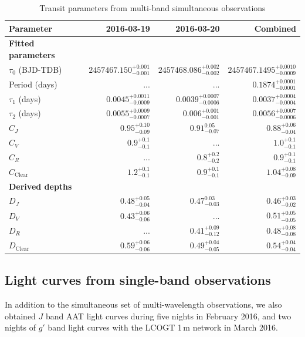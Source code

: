 \documentclass[iop,useAMES,usenatbig]{emulateapj}
\begin{document}
\begin{table}
\centering
\caption{\label{tab:simultaneous_params}Transit parameters from multi-band simultaneous observations}
\begin{tabular}{lrrr}
\hline\hline
Parameter & 2016-03-19 & 2016-03-20 & Combined\\
\hline
\textbf{Fitted parameters} & & & \\
$\tau_0$ (BJD-TDB) & $2457467.150_{-0.001}^{+0.001}$ & $2457468.086_{-0.002}^{+0.002}$ & $2457467.1495_{-0.0009}^{+0.0010}$\\
Period (days) & ... & ... & $0.1874_{-0.0001}^{+0.0001}$ \\ 
$\tau_1$ (days) & $0.0045_{-0.0009}^{+0.0011}$ & $0.0039_{-0.0006}^{+0.0007}$ & $0.0037_{-0.0004}^{+0.0004}$ \\
$\tau_2$ (days) & $0.0055_{-0.0007}^{+0.0009}$ & $0.006_{-0.001}^{+0.001}$ & $0.0056_{-0.0006}^{+0.0007}$ \\
$C_J$ & $0.95_{-0.09}^{+0.10}$ & $0.91_{-0.07}^{0.05}$ & $0.88_{-0.04}^{+0.06}$ \\
$C_V$ & $0.9_{-0.1}^{+0.1}$ & ... & $1.0_{-0.1}^{+0.1}$\\
$C_R$ & ... & $0.8_{-0.2}^{+0.2}$ & $0.9_{-0.1}^{+0.1}$ \\
$C_\mathrm{Clear}$ & $1.2_{-0.1}^{+0.1}$ & $0.9_{-0.1}^{+0.1}$ & $1.04_{-0.09}^{+0.08}$ \\
\textbf{Derived depths} && \\
$D_J$ & $0.48_{-0.04}^{+0.05}$ & $0.47_{-0.03}^{0.03}$ & $0.46_{-0.02}^{+0.03}$\\
$D_V$ & $0.43_{-0.06}^{+0.06}$ & ... & $0.51_{-0.05}^{+0.05}$\\
$D_R$ & ... & $0.41_{-0.12}^{+0.09}$ & $0.48_{-0.08}^{+0.08}$\\
$D_\mathrm{Clear}$ & $0.59_{-0.06}^{+0.06}$ & $0.49_{-0.05}^{+0.04}$ & $0.54_{-0.04}^{+0.04}$ \\
\hline
\end{tabular}
\end{table}

\subsection{Light curves from single-band observations}
\label{sec:single_band_lc}

In addition to the simultaneous set of multi-wavelength observations, we also obtained $J$ band AAT light curves during five nights in February 2016, and two nights of $g'$ band light curves with the LCOGT 1\,m network in March 2016. 
\end{document}
